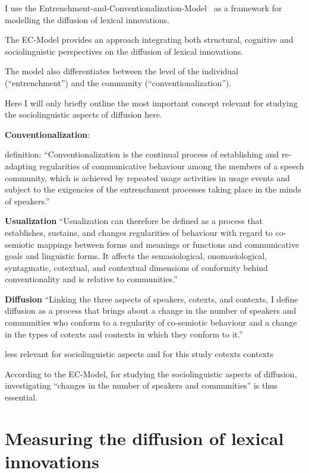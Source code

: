 \documentclass[a4paper, abstract=on]{scrartcl}
\renewcommand{\hw}[1]{\textbf{#1}}
\begin{document}
    I use the Entrenchment-and-Conventionalization-Model~\parencite{Schmid2020} as a framework for modelling the diffusion of lexical innovations.

      The EC-Model provides an approach integrating both structural, cognitive and sociolinguistic perspectives on the diffusion of lexical innovations.

      The model also differentiates between the level of the individual (\enquote{entrenchment}) and the community (\enquote{conventionalization}).

      Here I will only briefly outline the most important concept relevant for studying the sociolinguistic aspects of diffusion here.

    \hw{Conventionalization}:

      definition: \enquote{Conventionalization is the continual process of establishing and re-adapting regularities of communicative behaviour among the members of a speech community, which is achieved by repeated usage activities in usage events and subject to the exigencies of the entrenchment processes taking place in the minds of speakers.}~\parencite{Schmid2020}

    \hw{Usualization} \enquote{Usualization can therefore be defined as a process that establishes, sustains, and changes regularities of behaviour with regard to co-semiotic mappings between forms and meanings or functions and communicative goals and linguistic forms. It affects the semasiological, onomasiological, syntagmatic, cotextual, and contextual dimensions of conformity behind conventionality and is relative to communities.}~\parencite{Schmid2020}

    \hw{Diffusion} \enquote{Linking the three aspects of speakers, cotexts, and contexts, I define diffusion as a process that brings about a change in the number of speakers and communities who conform to a regularity of co-semiotic behaviour and a change in the types of cotexts and contexts in which they conform to it.}~\parencite{Schmid2020}

      less relevant for sociolinguistic aspects and for this study
        cotexts
        contexts

    According to the EC-Model, for studying the sociolinguistic aspects of diffusion, investigating \enquote{changes in the number of speakers and communities} is thus essential.

\section{Measuring the diffusion of lexical innovations}
\end{document}
